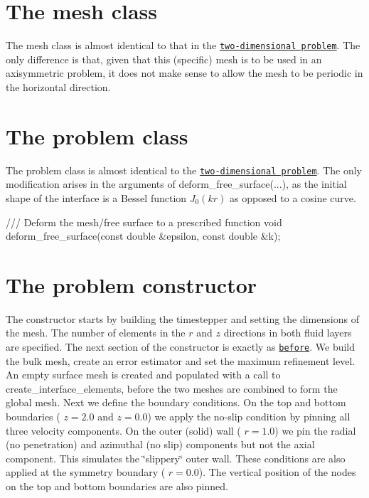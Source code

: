  

\hypertarget{index_mesh}{}\section{The mesh class}\label{index_mesh}
The mesh class is almost identical to that in the \href{../../../navier_stokes/two_layer_interface/html/index.html#mesh}{\tt two-\/dimensional problem}. The only difference is that, given that this (specific) mesh is to be used in an axisymmetric problem, it does not make sense to allow the mesh to be periodic in the horizontal direction.\hypertarget{index_problem_class}{}\section{The problem class}\label{index_problem_class}
The problem class is almost identical to the \href{../../../navier_stokes/two_layer_interface/html/index.html#problem_class}{\tt two-\/dimensional problem}. The only modification arises in the arguments of {\ttfamily deform\+\_\+free\+\_\+surface}(...), as the initial shape of the interface is a Bessel function $ J_0(kr) $ as opposed to a cosine curve.

 
\begin{DoxyCodeInclude}
 \textcolor{comment}{/// Deform the mesh/free surface to a prescribed function}
 \textcolor{keywordtype}{void} deform\_free\_surface(\textcolor{keyword}{const} \textcolor{keywordtype}{double} &epsilon, \textcolor{keyword}{const} \textcolor{keywordtype}{double} &k);

\end{DoxyCodeInclude}
\hypertarget{index_constructor}{}\section{The problem constructor}\label{index_constructor}
The constructor starts by building the timestepper and setting the dimensions of the mesh. The number of elements in the $ r $ and $ z $ directions in both fluid layers are specified. The next section of the constructor is exactly as \href{../../../navier_stokes/two_layer_interface/html/index.html#constructor}{\tt before}. We build the bulk mesh, create an error estimator and set the maximum refinement level. An empty surface mesh is created and populated with a call to {\ttfamily create\+\_\+interface\+\_\+elements}, before the two meshes are combined to form the global mesh. Next we define the boundary conditions. On the top and bottom boundaries ( $ z = 2.0 $ and $ z = 0.0 $) we apply the no-\/slip condition by pinning all three velocity components. On the outer (solid) wall ( $ r = 1.0 $) we pin the radial (no penetration) and azimuthal (no slip) components but not the axial component. This simulates the \char`\"{}slippery\char`\"{} outer wall. These conditions are also applied at the symmetry boundary ( $ r = 0.0 $). The vertical position of the nodes on the top and bottom boundaries are also pinned.


